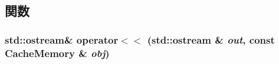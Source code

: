 \subsection{関数}
\hypertarget{CacheMemory_8hh_a01bb45d3868bc4af2565a556eeec2f6f}{
\subsubsection[{operator$<$$<$}]{\setlength{\rightskip}{0pt plus 5cm}std::ostream\& operator$<$$<$ (std::ostream \& {\em out}, \/  const {\bf CacheMemory} \& {\em obj})}}
\label{CacheMemory_8hh_a01bb45d3868bc4af2565a556eeec2f6f}

